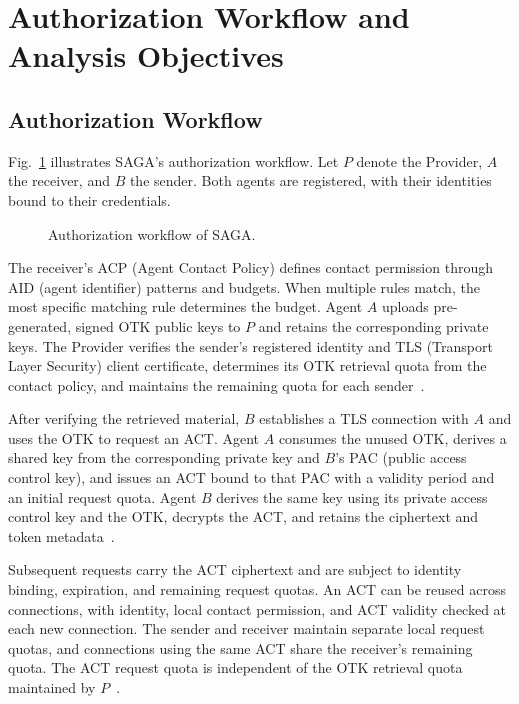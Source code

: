 
\section{Authorization Workflow and Analysis Objectives}
\label{sec:authorization-workflow-objectives}

\subsection{Authorization Workflow}
\label{subsec:authorization-workflow}

Fig.~\ref{fig:saga-authorization-workflow} illustrates SAGA's authorization workflow. Let $P$ denote the Provider, $A$ the receiver, and $B$ the sender. Both agents are registered, with their identities bound to their credentials.

\begin{figure}[tb]
  \centering
  
  \caption{Authorization workflow of SAGA.}
  \label{fig:saga-authorization-workflow}
\end{figure}

The receiver's ACP (Agent Contact Policy) defines contact permission through AID (agent identifier) patterns and budgets. When multiple rules match, the most specific matching rule determines the budget. Agent $A$ uploads pre-generated, signed OTK public keys to $P$ and retains the corresponding private keys. The Provider verifies the sender's registered identity and TLS (Transport Layer Security) client certificate, determines its OTK retrieval quota from the contact policy, and maintains the remaining quota for each sender~\cite{syros2025sagaV2,sagaReferenceImpl2026}.

After verifying the retrieved material, $B$ establishes a TLS connection with $A$ and uses the OTK to request an ACT. Agent $A$ consumes the unused OTK, derives a shared key from the corresponding private key and $B$'s PAC (public access control key), and issues an ACT bound to that PAC with a validity period and an initial request quota. Agent $B$ derives the same key using its private access control key and the OTK, decrypts the ACT, and retains the ciphertext and token metadata~\cite{syros2025sagaV2,sagaReferenceImpl2026}.

Subsequent requests carry the ACT ciphertext and are subject to identity binding, expiration, and remaining request quotas. An ACT can be reused across connections, with identity, local contact permission, and ACT validity checked at each new connection. The sender and receiver maintain separate local request quotas, and connections using the same ACT share the receiver's remaining quota. The ACT request quota is independent of the OTK retrieval quota maintained by $P$~\cite{sagaReferenceImpl2026}.

